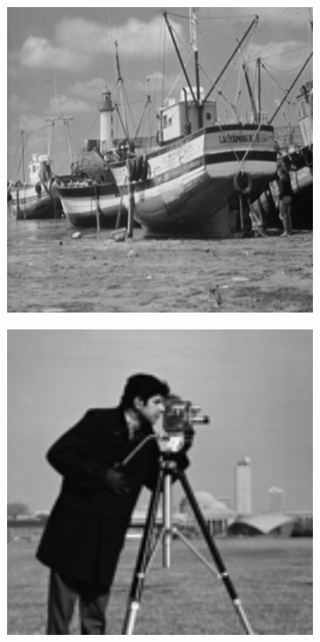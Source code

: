 \begin{figure}
\begin{subfigure}[b]{0.09\textwidth}
    \end{subfigure}
    \hfill
    \begin{subfigure}[b]{0.09\textwidth}
        \centering
        \includegraphics[width=1\textwidth]{images/pgpd/boat.png}
    \end{subfigure}
    \hfill
    \begin{subfigure}[b]{0.09\textwidth}
        \centering
        \includegraphics[width=1\textwidth]{images/pgpd/cameraman.png}

\end{subfigure}
\end{figure}
